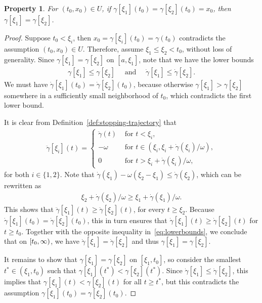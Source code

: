 \documentclass[a4paper]{article}
\theoremstyle{definition}
\theoremstyle{plain}
\newtheorem{property}{Property\hspace{0.25em}\ignorespaces}
\begin{document}
\begin{property}\label{prop:xi-unique}
  For $(t_{0}, x_{0}) \in U$, if
  $\gamma[\xi_{1}](t_{0}) = \gamma[\xi_{2}](t_{0}) = x_{0}$, then
  $\gamma[\xi_{1}] = \gamma[\xi_{2}]$.
\end{property}
\begin{proof}
  Suppose $t_{0} < \xi_{i}$, then $x_{0} = \gamma[\xi_{i}](t_{0}) = \gamma(t_{0})$ contradicts the assumption $(t_{0}, x_{0}) \in U$.
  Therefore, assume $\xi_{1} \leq \xi_{2} < t_{0}$, without loss of generality.
  Since $\gamma[\xi_{1}] = \gamma[\xi_{2}]$ on $[a, \xi_{1}]$, note that
  we have the lower bounds
  \begin{align}\label{eq:lowerbounds}
    \gamma[\xi_{1}] \leq \gamma[\xi_{2}] \quad \text{ and } \quad \dot{\gamma}[\xi_{1}] \leq \dot{\gamma}[\xi_{2}].
  \end{align}
  We must have $\dot{\gamma}[\xi_{1}](t_{0}) = \dot{\gamma}[\xi_{2}](t_{0})$,
  because otherwise $\gamma[\xi_{1}] > \gamma[\xi_{2}]$ somewhere in a
  sufficiently small neighborhood of $t_{0}$, which contradicts the first lower
  bound.

  It is clear from Definition~\ref{def:stopping-trajectory} that
  \begin{align}
    \ddot{\gamma}[\xi_{i}](t) =
    \begin{cases}
      \ddot{\gamma}(t) & \text{ for } t < \xi_{i} , \\
      - \omega & \text{ for } t \in (\xi_{i}, \xi_{i} + \dot{\gamma}(\xi_{i})/\omega) , \\
      0 & \text{ for } t > \xi_{i} + \dot{\gamma}(\xi_{i})/ \omega ,
    \end{cases}
  \end{align}
  for both $i \in \{ 1, 2\}$.
  Note that
  $\dot{\gamma}(\xi_{1}) - \omega(\xi_{2}-\xi_{1}) \leq \dot{\gamma}(\xi_{2})$,
  which can be rewritten as
  \begin{align}
    \xi_{2} + \dot{\gamma}(\xi_{2}) / \omega \geq \xi_{1} + \dot{\gamma}(\xi_{1}) / \omega .
  \end{align}
  This shows that $\ddot{\gamma}[\xi_{1}](t) \geq \ddot{\gamma}[\xi_{2}](t)$, for every
  $t \geq \xi_{2}$. Because
  $\dot{\gamma}[\xi_{1}](t_{0}) = \dot{\gamma}[\xi_{2}](t_{0})$, this in turn
  ensures that $\dot{\gamma}[\xi_{1}](t) \geq \dot{\gamma}[\xi_{2}](t)$ for $t \geq t_{0}$.
  Together with the opposite inequality in~\eqref{eq:lowerbounds}, we conclude
  that on $[t_{0},\infty)$, we have $\dot{\gamma}[\xi_{1}] = \dot{\gamma}[\xi_{2}]$
  and thus $\gamma[\xi_{1}] = \gamma[\xi_{2}]$.

  It remains to show that $\gamma[\xi_{1}] = \gamma[\xi_{2}]$ on $[\xi_{1}, t_{0}]$, so consider the smallest
  $t^{*} \in (\xi_{1}, t_{0})$ such that $\gamma[\xi_{1}](t^{*}) < \gamma[\xi_{2}](t^{*})$.
  Since $\dot{\gamma}[\xi_{1}] \leq \dot{\gamma}[\xi_{2}]$, this implies that $\gamma[\xi_{1}](t) < \gamma[\xi_{2}](t)$ for
  all $t \geq t^{*}$, but this contradicts the assumption $\gamma[\xi_{1}](t_{0}) = \gamma[\xi_{2}](t_{0})$.
\end{proof}
\end{document}
